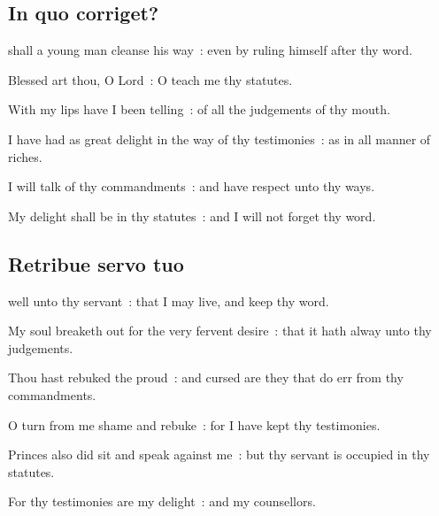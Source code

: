 \subsection{In quo corriget?}
 shall a young man cleanse his way~: even by ruling himself after thy word.\par
{}
Blessed art thou, O Lord~: O teach me thy statutes.\par
{}With my lips have I been telling~: of all the judgements of thy mouth.\par
{}I have had as great delight in the way of thy testimonies~: as in all manner of riches.\par
{}I will talk of thy commandments~: and have respect unto thy ways.\par
{}My delight shall be in thy statutes~: and I will not forget thy word.\par

\subsection{Retribue servo tuo}
 well unto thy servant~: that I may live, and keep thy word.\par
{}
My soul breaketh out for the very fervent desire~: that it hath alway unto thy judgements.\par
{}Thou hast rebuked the proud~: and cursed are they that do err from thy commandments.\par
{}O turn from me shame and rebuke~: for I have kept thy testimonies.\par
{}Princes also did sit and speak against me~: but thy servant is occupied in thy statutes.\par
{}For thy testimonies are my delight~: and my counsellors.\par

